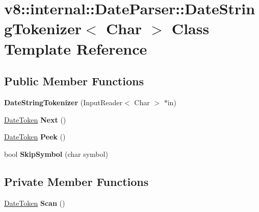 \hypertarget{classv8_1_1internal_1_1_date_parser_1_1_date_string_tokenizer}{}\section{v8\+:\+:internal\+:\+:Date\+Parser\+:\+:Date\+String\+Tokenizer$<$ Char $>$ Class Template Reference}
\label{classv8_1_1internal_1_1_date_parser_1_1_date_string_tokenizer}
\subsection*{Public Member Functions}
\begin{DoxyCompactItemize}
\item 
{\bfseries Date\+String\+Tokenizer} (Input\+Reader$<$ Char $>$ $\ast$in)\hypertarget{classv8_1_1internal_1_1_date_parser_1_1_date_string_tokenizer_a672d5d5839896332af3555a1b27f7186}{}\label{classv8_1_1internal_1_1_date_parser_1_1_date_string_tokenizer_a672d5d5839896332af3555a1b27f7186}

\item 
\hyperlink{structv8_1_1internal_1_1_date_parser_1_1_date_token}{Date\+Token} {\bfseries Next} ()\hypertarget{classv8_1_1internal_1_1_date_parser_1_1_date_string_tokenizer_a4cd07ac30678c878b7a2fdb32968e428}{}\label{classv8_1_1internal_1_1_date_parser_1_1_date_string_tokenizer_a4cd07ac30678c878b7a2fdb32968e428}

\item 
\hyperlink{structv8_1_1internal_1_1_date_parser_1_1_date_token}{Date\+Token} {\bfseries Peek} ()\hypertarget{classv8_1_1internal_1_1_date_parser_1_1_date_string_tokenizer_afc8be6373e0a55bb62cd9c14c62e31fd}{}\label{classv8_1_1internal_1_1_date_parser_1_1_date_string_tokenizer_afc8be6373e0a55bb62cd9c14c62e31fd}

\item 
bool {\bfseries Skip\+Symbol} (char symbol)\hypertarget{classv8_1_1internal_1_1_date_parser_1_1_date_string_tokenizer_ae4330f83e8bf186bca36bfa34fc93bbc}{}\label{classv8_1_1internal_1_1_date_parser_1_1_date_string_tokenizer_ae4330f83e8bf186bca36bfa34fc93bbc}

\end{DoxyCompactItemize}
\subsection*{Private Member Functions}
\begin{DoxyCompactItemize}
\item 
\hyperlink{structv8_1_1internal_1_1_date_parser_1_1_date_token}{Date\+Token} {\bfseries Scan} ()\hypertarget{classv8_1_1internal_1_1_date_parser_1_1_date_string_tokenizer_a6bd33c6f6031bd337177a26cf4bfb19c}{}\label{classv8_1_1internal_1_1_date_parser_1_1_date_string_tokenizer_a6bd33c6f6031bd337177a26cf4bfb19c}

\end{DoxyCompactItemize}
